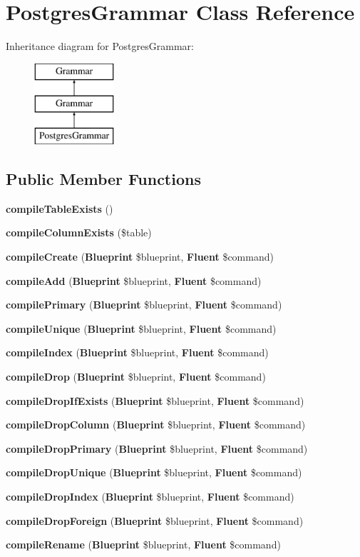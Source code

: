 \section{Postgres\+Grammar Class Reference}
\label{class_illuminate_1_1_database_1_1_schema_1_1_grammars_1_1_postgres_grammar}
Inheritance diagram for Postgres\+Grammar\+:\begin{figure}[H]
\begin{center}
\leavevmode
\includegraphics[height=3.000000cm]{class_illuminate_1_1_database_1_1_schema_1_1_grammars_1_1_postgres_grammar}
\end{center}
\end{figure}
\subsection*{Public Member Functions}
\begin{DoxyCompactItemize}
\item 
{\bf compile\+Table\+Exists} ()
\item 
{\bf compile\+Column\+Exists} (\$table)
\item 
{\bf compile\+Create} ({\bf Blueprint} \$blueprint, {\bf Fluent} \$command)
\item 
{\bf compile\+Add} ({\bf Blueprint} \$blueprint, {\bf Fluent} \$command)
\item 
{\bf compile\+Primary} ({\bf Blueprint} \$blueprint, {\bf Fluent} \$command)
\item 
{\bf compile\+Unique} ({\bf Blueprint} \$blueprint, {\bf Fluent} \$command)
\item 
{\bf compile\+Index} ({\bf Blueprint} \$blueprint, {\bf Fluent} \$command)
\item 
{\bf compile\+Drop} ({\bf Blueprint} \$blueprint, {\bf Fluent} \$command)
\item 
{\bf compile\+Drop\+If\+Exists} ({\bf Blueprint} \$blueprint, {\bf Fluent} \$command)
\item 
{\bf compile\+Drop\+Column} ({\bf Blueprint} \$blueprint, {\bf Fluent} \$command)
\item 
{\bf compile\+Drop\+Primary} ({\bf Blueprint} \$blueprint, {\bf Fluent} \$command)
\item 
{\bf compile\+Drop\+Unique} ({\bf Blueprint} \$blueprint, {\bf Fluent} \$command)
\item 
{\bf compile\+Drop\+Index} ({\bf Blueprint} \$blueprint, {\bf Fluent} \$command)
\item 
{\bf compile\+Drop\+Foreign} ({\bf Blueprint} \$blueprint, {\bf Fluent} \$command)
\item 
{\bf compile\+Rename} ({\bf Blueprint} \$blueprint, {\bf Fluent} \$command)
\end{DoxyCompactItemize}
